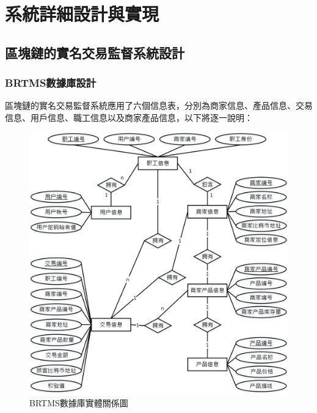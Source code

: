 \chapter{系統詳細設計與實現}

\section{區塊鏈的實名交易監督系統設計}

	\subsection{BRTMS數據庫設計}

	區塊鏈的實名交易監督系統應用了六個信息表，分別為商家信息、產品信息、交易信息、用戶信息、職工信息以及商家產品信息，以下將逐一說明：

		\begin{figure}[htbp]
			\centering
			\includegraphics[width = 1\textwidth]{er.jpg}
			\caption{BRTMS數據庫實體關係圖}\label{db}
		\end{figure}

